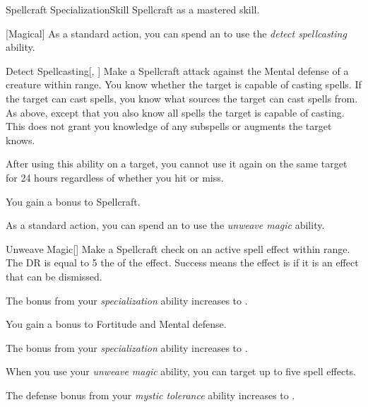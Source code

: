     \begin{feat}{Spellcraft Specialization}{Skill}
        \featpre Spellcraft as a mastered skill.

        [Magical] As a standard action, you can spend an  to use the \textit{detect spellcasting} ability.
        \begin{ability}{Detect Spellcasting}[, ]
            Make a Spellcraft attack against the Mental defense of a creature within \rngmed range.
            \hit You know whether the target is capable of casting spells.
            If the target can cast spells, you know what sources the target can cast spells from.
            \crit As above, except that you also know all spells the target is capable of casting.
            This does not grant you knowledge of any subspells or augments the target knows.

            After using this ability on a target, you cannot use it again on the same target for 24 hours regardless of whether you hit or miss.
        \end{ability}

         You gain a  bonus to Spellcraft.

         As a standard action, you can spend an  to use the \textit{unweave magic} ability.
        \begin{ability}{Unweave Magic}[]
            Make a Spellcraft check on an active spell effect within \rngmed range.
            The DR is equal to 5 \add the  of the effect.
            Success means the effect is  if it is an effect that can be dismissed.
        \end{ability}

         The bonus from your \textit{specialization} ability increases to .

         You gain a  bonus to Fortitude and Mental defense.

         The bonus from your \textit{specialization} ability increases to .

         When you use your \textit{unweave magic} ability, you can target up to five spell effects.

         The defense bonus from your \textit{mystic tolerance} ability increases to .
    \end{feat}

